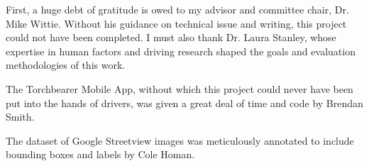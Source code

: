First, a huge debt of gratitude is owed to my advisor and committee chair, Dr. Mike Wittie. Without his guidance on technical issue and writing, this project could not have been completed. I must also thank Dr. Laura Stanley, whose expertise in human factors and driving research shaped the goals and evaluation methodologies of this work.

The Torchbearer Mobile App, without which this project could never have been put into the hands of drivers, was given a great deal of time and code by Brendan Smith.

The dataset of Google Streetview images was meticulously annotated to include bounding boxes and labels by Cole Homan.